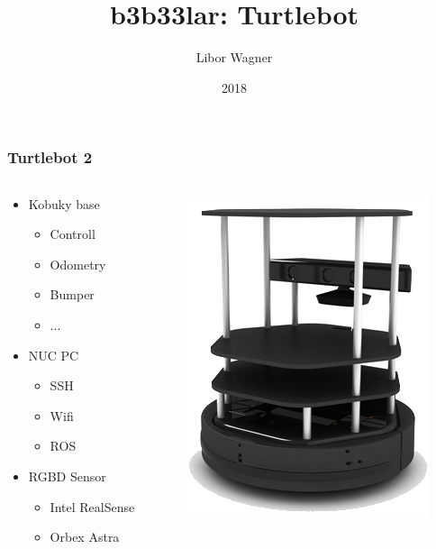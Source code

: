 \documentclass{beamer}
\title{b3b33lar: Turtlebot}
\author{Libor Wagner}
\date{2018}
\begin{document}
\frame{\titlepage}

\begin{frame}
  \frametitle{Turtlebot 2}
  \begin{columns}
    \begin{column}{0.5\textwidth}
      \begin{itemize}
      \item Kobuky base
        \begin{itemize}
        \item Controll
        \item Odometry
        \item Bumper
        \item ...
        \end{itemize}
      \item NUC PC
        \begin{itemize}
        \item SSH
        \item Wifi
        \item ROS
        \end{itemize}
      \item RGBD Sensor
        \begin{itemize}
        \item Intel RealSense
        \item Orbex Astra
        \end{itemize}
      \end{itemize}
    \end{column}
    \begin{column}{0.5\textwidth}
      \begin{center}
        \includegraphics[]{fig/turtlebot_2}
      \end{center}
    \end{column}
  \end{columns}
\end{frame}
\end{document}

